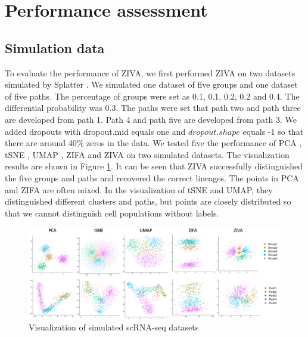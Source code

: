 \section{Performance assessment}
\subsection{Simulation data}
To evaluate the performance of ZIVA, we first performed ZIVA on two datasets simulated by Splatter \cite{zappia2017splatter}. We simulated one dataset of five groups and one dataset of five paths. The percentage of groups were set as 0.1, 0.1, 0.2, 0.2 and 0.4. The differential probability was 0.3. The paths were set that path two and path three are developed from path 1. Path 4 and path five are developed from path 3. We added dropouts with dropout.mid equals one and $dropout.shape$ equals -1 so that there are around 40\% zeros in the data. We tested five the performance of PCA \cite{Abdi2010}, tSNE \cite{maaten2008visualizing}, UMAP \cite{McInnes2018}, ZIFA \cite{Pierson2015} and ZIVA on two simulated datasets. The visualization results are shown in Figure \ref{sim}. It can be seen that ZIVA successfully distinguished the five groups and paths and recovered the correct lineages. The points in PCA and ZIFA are often mixed. In the visualization of tSNE and UMAP, they distinguished different clusters and paths, but points are closely distributed so that we cannot distinguish cell populations without labels. 
\begin{figure}[htb!]
    \centering
    \includegraphics[width=1\textwidth]{figures/myfigures/simdata.png}
    \caption{Visualization of simulated scRNA-seq datasets}
    \label{sim}
\end{figure}

\clearpage

